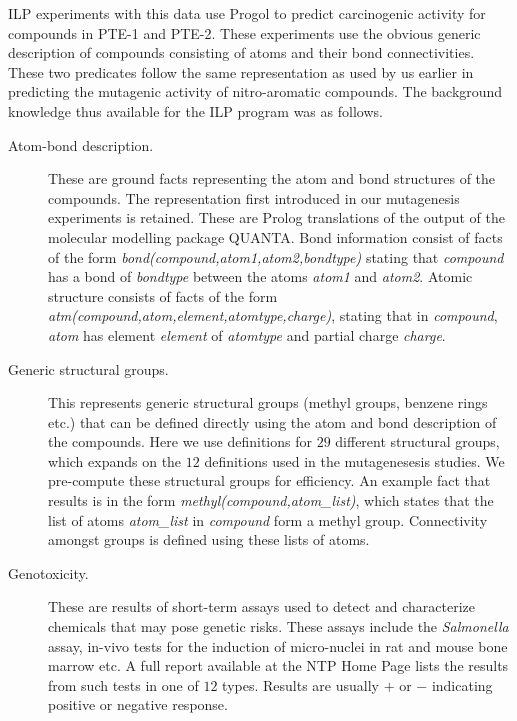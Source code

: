 ILP experiments with this data use Progol to predict
carcinogenic activity for compounds in PTE-1 and PTE-2.
These experiments use the obvious generic description of compounds
consisting of atoms and their bond connectivities.
These two predicates follow the same representation as used by us earlier
in predicting the mutagenic activity of nitro-aromatic compounds.
The background knowledge thus available for the ILP program was as follows.

\begin{description}
\item[Atom-bond description.] These are ground facts representing
        the atom and bond structures of the compounds. The
        representation first introduced in our mutagenesis experiments is retained.
        These are Prolog translations of the output of the molecular
        modelling package QUANTA. Bond information consist of facts of the form
        {\it bond(compound,atom1,atom2,bondtype)\/} stating that
        {\em compound\/} has a bond of {\em bondtype\/} between the atoms
        {\em atom1\/} and {\em atom2\/}. Atomic structure consists of facts
        of the form {\em atm(compound,atom,element,atomtype,charge)\/},
        stating that in {\em compound\/}, {\em atom\/} has element
        {\em element\/} of {\em atomtype\/} and partial charge {\em charge\/}.
\item[Generic structural groups.] This represents generic structural
        groups (methyl groups, benzene rings etc.) that can be defined
        directly using the atom and bond description of the compounds.
        Here we use definitions for $29$ different structural
        groups, which expands on the $12$ definitions
        used in the mutagenesesis studies.
        We pre-compute these structural
        groups for efficiency. An example fact that
        results is in the form {\em methyl(compound,atom\_list)\/},
        which states that the list of atoms
        {\em atom\_list\/} in {\em compound\/} form
        a methyl group. Connectivity amongst groups is
        defined using these lists of atoms.
\item[Genotoxicity.] These are results of short-term assays
        used to detect and characterize chemicals that may
        pose genetic risks. These assays include
        the {\em Salmonella\/} assay, in-vivo tests for the
        induction of micro-nuclei in rat and mouse bone marrow etc.
        A full report available at the NTP Home Page
        lists the results from such tests in one of $12$ types.
        Results are usually $+$ or $-$ indicating positive or negative response.

\end{description}
